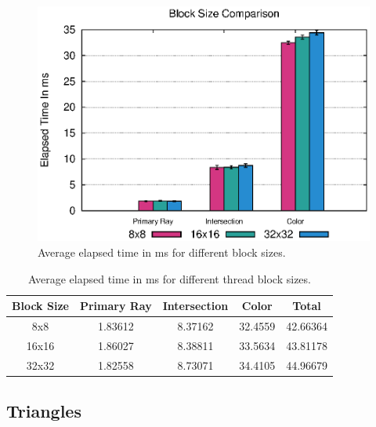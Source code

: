 \documentclass{article}
\begin{document}
\begin{figure}[h!tbp]
    \centering
    \includegraphics[width=1.0\columnwidth]{Figures/blocksize.eps}
    \caption{Average elapsed time in ms for different block sizes. \label{fig:blockSize}}
\end{figure}

\begin{table}[h!btp]
\centering
\begin{tabular}{c|c|c|c|c}
    Block Size & Primary Ray & Intersection & Color & Total \\ [2pt]
\hline
    8x8 & 1.83612 & 8.37162 & 32.4559 & 42.66364 \\
\hline
    16x16 & 1.86027 & 8.38811 & 33.5634 & 43.81178 \\
\hline
    32x32 & 1.82558 & 8.73071 & 34.4105 & 44.96679 \\
\hline
\end{tabular}
\caption{Average elapsed time in ms for different thread block sizes. \label{tab:ResultsThreadBlockSize}}
\end{table}


\subsection{Triangles}
\end{document}
